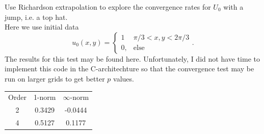 \item Use Richardson extrapolation to explore the convergence rates for $U_0$ with a jump, i.e. a top hat.\\
Here we use initial data
$$u_0(x,y)=\left\{\begin{array}{cc}1&\pi/3<x,y<2\pi/3 \\0,&\text{else}\end{array}\right..$$
The results for this test may be found here. Unfortunately, I did not have time to implement this code in the C-architechture so that the convergence test may be run on larger grids to get better $p$ values.
\begin{table}[h]
\centering
\begin{tabular}{c|c|c}
\hline
Order&1-norm&$\infty$-norm\\
2&0.3429&-0.0444\\
4&0.5127&0.1177\\
\hline
\end{tabular}
\end{table}
\eenum

